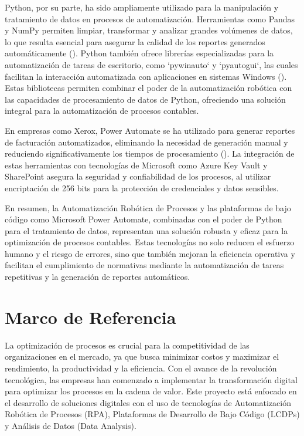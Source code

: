 \documentclass[letter,oneside,12pt,spanish]{report}
\begin{document}
\noindent Python, por su parte, ha sido ampliamente utilizado para la manipulación y tratamiento de datos en procesos de automatización. Herramientas como Pandas y NumPy permiten limpiar, transformar y analizar grandes volúmenes de datos, lo que resulta esencial para asegurar la calidad de los reportes generados automáticamente (\cite{rattenbury2017principles}). Python también ofrece librerías especializadas para la automatización de tareas de escritorio, como `pywinauto` y `pyautogui`, las cuales facilitan la interacción automatizada con aplicaciones en sistemas Windows (\cite{pywinauto2024}). Estas bibliotecas permiten combinar el poder de la automatización robótica con las capacidades de procesamiento de datos de Python, ofreciendo una solución integral para la automatización de procesos contables.

\noindent En empresas como Xerox, Power Automate se ha utilizado para generar reportes de facturación automatizados, eliminando la necesidad de generación manual y reduciendo significativamente los tiempos de procesamiento (\cite{xerox2023powerautomate}). La integración de estas herramientas con tecnologías de Microsoft como Azure Key Vault y SharePoint asegura la seguridad y confiabilidad de los procesos, al utilizar encriptación de 256 bits para la protección de credenciales y datos sensibles.

\noindent En resumen, la Automatización Robótica de Procesos y las plataformas de bajo código como Microsoft Power Automate, combinadas con el poder de Python para el tratamiento de datos, representan una solución robusta y eficaz para la optimización de procesos contables. Estas tecnologías no solo reducen el esfuerzo humano y el riesgo de errores, sino que también mejoran la eficiencia operativa y facilitan el cumplimiento de normativas mediante la automatización de tareas repetitivas y la generación de reportes automáticos.



\newpage

\chapter{Marco de Referencia}
\label{sec:marco-referencia}

\noindent La optimización de procesos es crucial para la competitividad de las organizaciones en el mercado, ya que busca minimizar costos y maximizar el rendimiento, la productividad y la eficiencia. Con el avance de la revolución tecnológica, las empresas han comenzado a implementar la transformación digital para optimizar los procesos en la cadena de valor. Este proyecto está enfocado en el desarrollo de soluciones digitales con el uso de tecnologías de Automatización Robótica de Procesos (RPA), Plataformas de Desarrollo de Bajo Código (LCDPs) y Análisis de Datos (Data Analysis).
\end{document}

